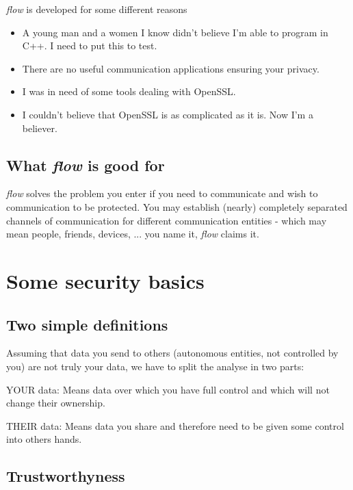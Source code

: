 \documentclass[twoside,a4paper,english,12pt,authoryear,openright]{book}
\newcommand{\flow}{\textit{flow} }
\begin{document}
\flow is developed for some different reasons

\begin{itemize}
  \item {A young man and a women I know didn't believe I'm able to program in C++. I need to put this to test.}
  \item {There are no useful communication applications ensuring your privacy.}
  \item {I was in need of some tools dealing with OpenSSL.}
  \item {I couldn't believe that OpenSSL is as complicated as it is. Now I'm a believer.}
\end{itemize}

\subsection{What \flow is good for}

\flow solves the problem you enter if you need to communicate and wish to communication to be protected. You may establish (nearly) completely separated channels of communication for different communication entities - which may mean people, friends, devices, ... you name it, \flow claims it.


\section{Some security basics}

\subsection{Two simple definitions}

Assuming that data you send to others (autonomous entities, not controlled by you)  are not truly your data, we have to split the analyse in two parts:

\begin{description}
  \item{YOUR data:} Means data over which you have full control and which will not change their ownership.
  \item{THEIR data:} Means data you share and therefore need to be given some control into others hands.
\end{description}

\subsection{Trustworthyness}
\end{document}

